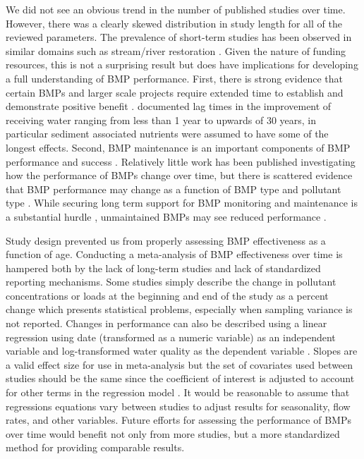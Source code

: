 \documentclass[utf8]{FrontiersinHarvard}
\begin{document}
We did not see an obvious trend in the number of published studies over time.
However, there was a clearly skewed distribution in study length for all of the reviewed parameters.
The prevalence of short-term studies has been observed in similar domains such as stream/river restoration \citep{bernhardtSynthesizingRiverRestoration2005}.
Given the nature of funding resources, this is not a surprising result but does have implications for developing a full understanding of BMP performance.
First, there is strong evidence that certain BMPs and larger scale projects require extended time to establish and demonstrate positive benefit \citep{mealsLagTimeWater2010, grudzinskiDoesRiparianFencing2020}.
\citet{mealsLagTimeWater2010} documented lag times in the improvement of receiving water ranging from less than 1 year to upwards of 30 years, in particular sediment associated nutrients were assumed to have some of the longest effects.
Second, BMP maintenance is an important components of BMP performance and success \citep{kochNitrogenRemovalStormwater2014, heidariGreenStormwaterInfrastructure2023}.
Relatively little work has been published investigating how the performance of BMPs change over time, but there is scattered evidence that BMP performance may change as a function of BMP type and pollutant type \citep{liuReviewEffectivenessBest2017}.
While securing long term support for BMP monitoring and maintenance is a substantial hurdle \citep{heidariGreenStormwaterInfrastructure2023}, unmaintained BMPs may see reduced performance \citep{kochNitrogenRemovalStormwater2014, liuReviewEffectivenessBest2017}.

Study design prevented us from properly assessing BMP effectiveness as a function of age.
Conducting a meta-analysis of BMP effectiveness over time is hampered both by the lack of long-term studies and lack of standardized reporting mechanisms.
Some studies simply describe the change in pollutant concentrations or loads at the beginning and end of the study as a percent change \citep{haileHydraulicPerformancePollutant2016} which presents statistical problems, especially when sampling variance is not reported.
Changes in performance can also be described using a linear regression using date (transformed as a numeric variable) as an independent variable and log-transformed water quality as the dependent variable \citep{mitschCreatingWetlandsPrimary2012, mitschValidationEcosystemServices2014, pausAssessmentHydraulicToxic2014}.
Slopes are a valid effect size for use in meta-analysis but the set of covariates used between studies should be the same since the coefficient of interest is adjusted to account for other terms in the regression model \citep{beckerSynthesisRegressionSlopes2007}.
It would be reasonable to assume that regressions equations vary between studies to adjust results for seasonality, flow rates, and other variables.
Future efforts for assessing the performance of BMPs over time would benefit not only from more studies, but a more standardized method for providing comparable results.
\end{document}
